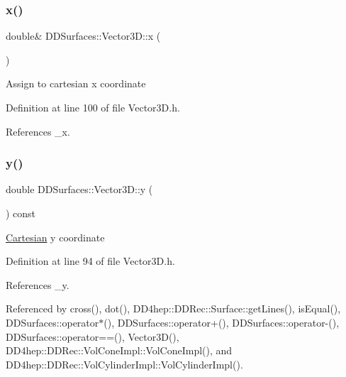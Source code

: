 \hypertarget{class_d_d_surfaces_1_1_vector3_d_a42067b3c5580bcb067a91e27c0c99352}{}\label{class_d_d_surfaces_1_1_vector3_d_a42067b3c5580bcb067a91e27c0c99352} 
\subsubsection{\texorpdfstring{x()}{x()}\hspace{0.1cm}{\footnotesize\ttfamily [2/2]}}
{\footnotesize\ttfamily double\& D\+D\+Surfaces\+::\+Vector3\+D\+::x (\begin{DoxyParamCaption}{ }\end{DoxyParamCaption})\hspace{0.3cm}{\ttfamily [inline]}}

Assign to cartesian x coordinate 

Definition at line 100 of file Vector3\+D.\+h.



References \+\_\+x.

\hypertarget{class_d_d_surfaces_1_1_vector3_d_a553ea5b00ce2220e35c9cd6526a89fa6}{}\label{class_d_d_surfaces_1_1_vector3_d_a553ea5b00ce2220e35c9cd6526a89fa6} 
\subsubsection{\texorpdfstring{y()}{y()}\hspace{0.1cm}{\footnotesize\ttfamily [1/2]}}
{\footnotesize\ttfamily double D\+D\+Surfaces\+::\+Vector3\+D\+::y (\begin{DoxyParamCaption}{ }\end{DoxyParamCaption}) const\hspace{0.3cm}{\ttfamily [inline]}}

\hyperlink{struct_d_d_surfaces_1_1_vector3_d_1_1_cartesian}{Cartesian} y coordinate 

Definition at line 94 of file Vector3\+D.\+h.



References \+\_\+y.



Referenced by cross(), dot(), D\+D4hep\+::\+D\+D\+Rec\+::\+Surface\+::get\+Lines(), is\+Equal(), D\+D\+Surfaces\+::operator$\ast$(), D\+D\+Surfaces\+::operator+(), D\+D\+Surfaces\+::operator-\/(), D\+D\+Surfaces\+::operator==(), Vector3\+D(), D\+D4hep\+::\+D\+D\+Rec\+::\+Vol\+Cone\+Impl\+::\+Vol\+Cone\+Impl(), and D\+D4hep\+::\+D\+D\+Rec\+::\+Vol\+Cylinder\+Impl\+::\+Vol\+Cylinder\+Impl().

